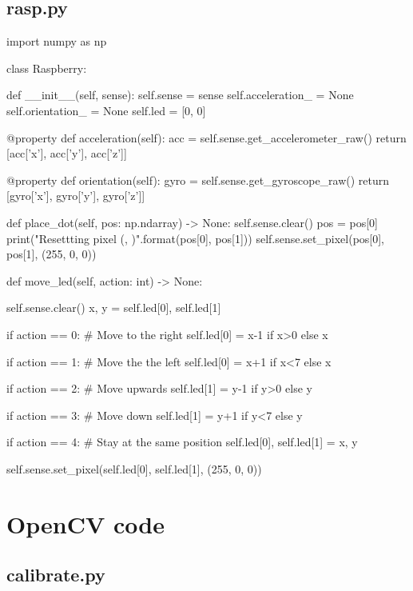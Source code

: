 \subsection{rasp.py}
\label{rasp_code}
\begin{pyverbatim}
import numpy as np


class Raspberry:

    def __init__(self, sense):
        self.sense = sense
        self.acceleration_ = None
        self.orientation_ = None
        self.led = [0, 0]

    @property
    def acceleration(self):
        acc = self.sense.get_accelerometer_raw()
        return [acc['x'], acc['y'], acc['z']]

    @property
    def orientation(self):
        gyro = self.sense.get_gyroscope_raw()
        return [gyro['x'], gyro['y'], gyro['z']]

    def place_dot(self, pos: np.ndarray) -> None:
        self.sense.clear()
        pos = pos[0]
        print("Resettting pixel ({}, {})".format(pos[0], pos[1]))
        self.sense.set_pixel(pos[0], pos[1], (255, 0, 0))

    def move_led(self, action: int) -> None:

        self.sense.clear()
        x, y = self.led[0], self.led[1]

        if action == 0:  # Move to the right
            self.led[0] = x-1 if x>0 else x

        if action == 1:  # Move the the left
            self.led[0] = x+1 if x<7 else x

        if action == 2:  # Move upwards
            self.led[1] = y-1 if y>0 else y

        if action == 3:  # Move down
            self.led[1] = y+1 if y<7 else y
        
        if action == 4:  # Stay at the same position
            self.led[0], self.led[1] = x, y
        
        self.sense.set_pixel(self.led[0], self.led[1], (255, 0, 0))

\end{pyverbatim}

\section{OpenCV code}

\subsection{calibrate.py}
\label{calibrate}

